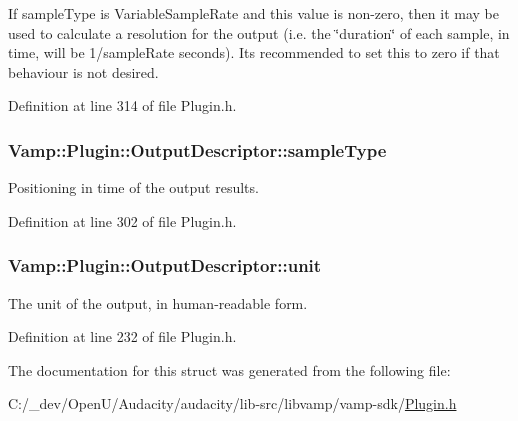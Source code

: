 If sample\+Type is Variable\+Sample\+Rate and this value is non-\/zero, then it may be used to calculate a resolution for the output (i.\+e. the \char`\"{}duration\char`\"{} of each sample, in time, will be 1/sample\+Rate seconds). It\textquotesingle{}s recommended to set this to zero if that behaviour is not desired. 

Definition at line 314 of file Plugin.\+h.

\subsubsection[{\texorpdfstring{sample\+Type}{sampleType}}]{ Vamp\+::\+Plugin\+::\+Output\+Descriptor\+::sample\+Type}\hypertarget{struct_vamp_1_1_plugin_1_1_output_descriptor_a0d1194980d44e31b25ef3b4b070d6b5d}{}\label{struct_vamp_1_1_plugin_1_1_output_descriptor_a0d1194980d44e31b25ef3b4b070d6b5d}
Positioning in time of the output results. 

Definition at line 302 of file Plugin.\+h.

\subsubsection[{\texorpdfstring{unit}{unit}}]{ Vamp\+::\+Plugin\+::\+Output\+Descriptor\+::unit}\hypertarget{struct_vamp_1_1_plugin_1_1_output_descriptor_aa057a8833fa037f06ac9f7b85b85d5e4}{}\label{struct_vamp_1_1_plugin_1_1_output_descriptor_aa057a8833fa037f06ac9f7b85b85d5e4}
The unit of the output, in human-\/readable form. 

Definition at line 232 of file Plugin.\+h.



The documentation for this struct was generated from the following file\+:\begin{DoxyCompactItemize}
\item 
C\+:/\+\_\+dev/\+Open\+U/\+Audacity/audacity/lib-\/src/libvamp/vamp-\/sdk/\hyperlink{libvamp_2vamp-sdk_2plugin_8h}{Plugin.\+h}\end{DoxyCompactItemize}
